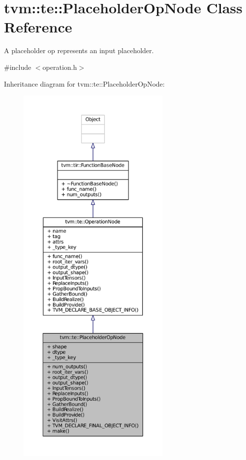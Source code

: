 \hypertarget{classtvm_1_1te_1_1PlaceholderOpNode}{}\section{tvm\+:\+:te\+:\+:Placeholder\+Op\+Node Class Reference}
\label{classtvm_1_1te_1_1PlaceholderOpNode}


A placeholder op represents an input placeholder.  




{\ttfamily \#include $<$operation.\+h$>$}



Inheritance diagram for tvm\+:\+:te\+:\+:Placeholder\+Op\+Node\+:
\nopagebreak
\begin{figure}[H]
\begin{center}
\leavevmode
\includegraphics[height=550pt]{classtvm_1_1te_1_1PlaceholderOpNode__inherit__graph}
\end{center}
\end{figure}


